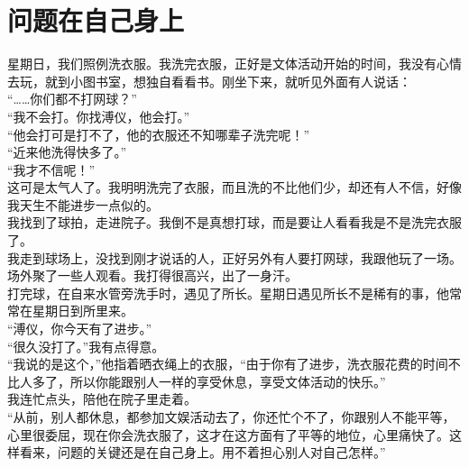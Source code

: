 \fancyhead[RO]{} %
\fancyhead[LE]{} %
\chapter*{问题在自己身上}
\thispagestyle{empty}
星期日，我们照例洗衣服。我洗完衣服，正好是文体活动开始的时间，我没有心情去玩，就到小图书室，想独自看看书。刚坐下来，就听见外面有人说话：\\

“……你们都不打网球？”\\

“我不会打。你找溥仪，他会打。”\\

“他会打可是打不了，他的衣服还不知哪辈子洗完呢！”\\

“近来他洗得快多了。”\\

“我才不信呢！”\\

这可是太气人了。我明明洗完了衣服，而且洗的不比他们少，却还有人不信，好像我天生不能进步一点似的。\\

我找到了球拍，走进院子。我倒不是真想打球，而是要让人看看我是不是洗完衣服了。\\

我走到球场上，没找到刚才说话的人，正好另外有人要打网球，我跟他玩了一场。场外聚了一些人观看。我打得很高兴，出了一身汗。\\

打完球，在自来水管旁洗手时，遇见了所长。星期日遇见所长不是稀有的事，他常常在星期日到所里来。\\

“溥仪，你今天有了进步。”\\

“很久没打了。”我有点得意。\\

“我说的是这个，”他指着晒衣绳上的衣服，“由于你有了进步，洗衣服花费的时间不比人多了，所以你能跟别人一样的享受休息，享受文体活动的快乐。”\\

我连忙点头，陪他在院子里走着。\\

“从前，别人都休息，都参加文娱活动去了，你还忙个不了，你跟别人不能平等，心里很委屈，现在你会洗衣服了，这才在这方面有了平等的地位，心里痛快了。这样看来，问题的关键还是在自己身上。用不着担心别人对自己怎样。”\\

